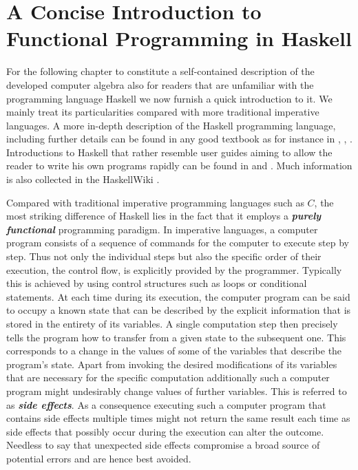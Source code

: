 
\section{A Concise Introduction to Functional Programming in Haskell}
For the following chapter to constitute a self-contained description of the developed computer algebra also for readers that are unfamiliar with the programming language Haskell \cite{Marlow_haskell2010} we now furnish a quick introduction to it. We mainly treat its particularities compared with more traditional imperative languages.
A more in-depth description of the Haskell programming language, including 
further details can be found in any good textbook as for instance in \cite{Thompson99thecraft}, \cite{bird_2014}, \cite{hutton_2007}. Introductions to Haskell that rather resemble user guides aiming to allow the reader to write his own programs rapidly can be found in  \cite{OSullivan2008} and  \cite{Lipovaca:2011:LYH:2018642}. Much information is also collected in the HaskellWiki \cite{wiki:xxx}.

Compared with traditional imperative programming languages such as $C$, the most striking difference of Haskell lies in the fact that it employs a \textbf{\textit{purely functional}} programming paradigm. In imperative languages, a computer program consists of a sequence of commands for the computer to execute step by step. Thus not only the individual steps but also the specific order of their execution, the control flow, is explicitly provided by the programmer. Typically this is achieved by using control structures such as loops or conditional statements. At each time during its execution, the computer program can be said to occupy a known state that can be described by the explicit information that is stored in the entirety of its variables. A single computation step then precisely tells the program how to transfer from a given state to the subsequent one. This corresponds to a change in the values of some of the variables that describe the program's state. Apart from invoking the desired modifications of its variables that are necessary for the specific computation additionally such a computer program might undesirably change values of further variables. This is referred to as \textit{\textbf{side effects}}. As a consequence executing such a computer program that contains side effects multiple times might not return the same result each time as side effects that possibly occur during the execution can alter the outcome. Needless to say that unexpected side effects compromise a broad source of potential errors and are hence best avoided.

